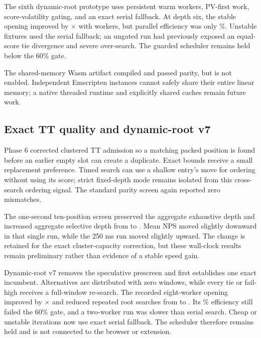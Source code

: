 The sixth dynamic-root prototype uses persistent warm workers, PV-first work,
score-volatility gating, and an exact serial fallback. At depth six, the stable
opening improved by \DynamicRootOpeningSpeedup$\times$ with
\DynamicRootWorkers{} workers, but parallel efficiency was only
\DynamicRootOpeningEfficiency\%. Unstable fixtures used the serial fallback;
an ungated run had previously exposed an equal-score tie divergence and severe
over-search. The guarded scheduler remains held below the 60\% gate.

The shared-memory Wasm artifact compiled and passed parity, but is not enabled.
Independent Emscripten instances cannot safely share their entire linear memory;
a native threaded runtime and explicitly shared caches remain future work.


\subsection{Exact TT quality and dynamic-root v7}
Phase 6 corrected clustered TT admission so a matching packed position is
found before an earlier empty slot can create a duplicate. Exact bounds receive
a small replacement preference. Timed search can use a shallow entry's move for
ordering without using its score; strict fixed-depth mode remains isolated from
this cross-search ordering signal. The standard parity screen again reported
zero mismatches.

The one-second ten-position screen preserved the aggregate exhaustive depth and
increased aggregate selective depth from \PhaseSixBaselineSelectiveDepth{} to
\PhaseSixCandidateSelectiveDepth{}. Mean NPS moved slightly downward in that
single run, while the 250 ms run moved slightly upward. The change is retained
for the exact cluster-capacity correction, but these wall-clock results remain
preliminary rather than evidence of a stable speed gain.

Dynamic-root v7 removes the speculative prescreen and first establishes one
exact incumbent. Alternatives are distributed with zero windows, while every
tie or fail-high receives a full-window re-search. The recorded eight-worker
opening improved by \PhaseSevenOpeningSpeedup$\times$ and reduced repeated root
searches from \PhaseSevenPriorRepeatedMoves{} to
\PhaseSevenRepeatedMoves{}. Its \PhaseSevenOpeningEfficiency\% efficiency
still failed the 60\% gate, and a two-worker run was slower than serial search.
Cheap or unstable iterations now use exact serial fallback. The scheduler
therefore remains held and is not connected to the browser or extension.

